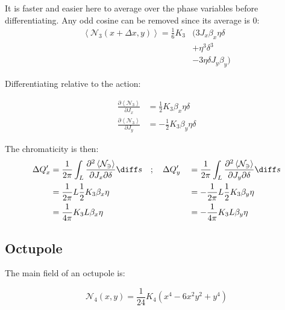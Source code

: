 It is faster and easier here to average over the phase variables before
differentiating. Any odd cosine can be removed since its average is 0:
\begin{equation}\begin{aligned}
  \left< \mathcal{N_3}(x + \Delta x, y) \right> = \frac{1}{6} K_3 &\biggl(
       3 J_x \beta_x \eta \delta \\
  &    + \eta^3 \delta^3 \\
  &    - 3 \eta \delta J_y \beta_y \biggl)
\end{aligned}\end{equation}

\vspace{.5cm}

Differentiating relative to the action:

\begin{equation}\begin{aligned}
\frac{\partial \left< \mathcal{N_3} \right>}{\partial J_x} &= \frac{1}{2} K_3 \beta_x \eta \delta \\
\frac{\partial \left< \mathcal{N_3} \right>}{\partial J_y} &= - \frac{1}{2} K_3 \beta_y \eta \delta
\end{aligned}\end{equation}

The chromaticity is then: \begin{equation}\begin{aligned}
\Delta Q'_x &= \frac{1}{2\pi} \int_L \frac{\partial^2 \left< \mathcal{N_3} \right>}{\partial J_x \partial \delta} \diff s \quad; \quad \Delta Q'_y &&= \frac{1}{2\pi} \int_L \frac{\partial^2 \left< \mathcal{N_3} \right>}{\partial J_y \partial \delta} \diff s \\
&= \frac{1}{2 \pi} L \frac{1}{2} K_3 \beta_x \eta  &&= - \frac{1}{2 \pi} L \frac{1}{2} K_3 \beta_y \eta \\
&= \frac{1}{4 \pi}  K_3 L \beta_x \eta &&= - \frac{1}{4 \pi}  K_3 L \beta_y \eta
\end{aligned}\end{equation}

\hypertarget{octupole-1}{%
\subsection{Octupole}\label{octupole-1}}

The main field of an octupole is:

\begin{equation}\mathcal{N}_4(x, y) = \frac{1}{24} K_4 (x^4 - 6x^2y^2 + y^4)\end{equation}

